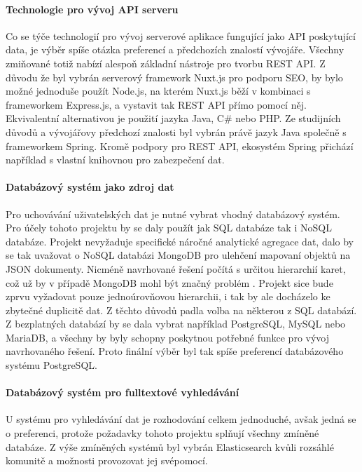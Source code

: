 			\paragraph{Technologie pro vývoj API serveru}

			Co se týče technologií pro vývoj serverové aplikace fungující jako \ac{API} poskytující data, je výběr spíše
			otázka preferencí a předchozích znalostí vývojáře.
			Všechny zmiňované totiž nabízí alespoň základní nástroje pro tvorbu \ac{REST} \ac{API}.
			Z důvodu že byl vybrán serverový framework Nuxt.js pro podporu \Ac{SEO}, by bylo možné jednoduše použít Node.js,
			na kterém Nuxt.js běží v kombinaci s frameworkem Express.js, a vystavit tak \Ac{REST} \ac{API} přímo pomocí něj.
			Ekvivalentní alternativou je použití jazyka Java, C\# nebo \Ac{PHP}.
			Ze studijních důvodů a vývojářovy předchozí znalosti byl vybrán právě jazyk Java společně s frameworkem
			Spring.
			Kromě podpory pro \ac{REST} \ac{API}, ekosystém Spring přichází například s vlastní knihovnou pro
			zabezpečení dat.

			\paragraph{Databázový systém jako zdroj dat}

			Pro uchovávání uživatelských dat je nutné vybrat vhodný databázový systém.
			Pro účely tohoto projektu by se daly použít jak \ac{SQL} databáze tak i \ac{NoSQL} databáze.
			Projekt nevyžaduje specifické náročné analytické agregace dat, dalo by se tak uvažovat o \ac{NoSQL} databázi
			MongoDB pro ulehčení mapovaní objektů na \ac{JSON} dokumenty.
			Nicméně navrhované řešení počítá s určitou hierarchií karet, což už by v případě MongoDB mohl být značný
			problém \cite{why_you_should_never_use_mongodb}.
			Projekt sice bude zprvu vyžadovat pouze jednoúrovňovou hierarchii, i tak by ale docházelo ke
			zbytečné duplicitě dat.
			Z těchto důvodů padla volba na některou z \ac{SQL} databází.
			Z bezplatných databází by se dala vybrat například PostgreSQL, MySQL nebo MariaDB, a všechny by byly schopny
			poskytnou potřebné funkce pro vývoj navrhovaného řešení.
			Proto finální výběr byl tak spíše preferencí databázového systému PostgreSQL.

			\paragraph{Databázový systém pro fulltextové vyhledávání}

			U systému pro vyhledávání dat je rozhodování celkem jednoduché, avšak jedná se o preferenci, protože
			požadavky tohoto projektu splňují všechny zmíněné databáze.
			Z výše zmíněných systémů byl vybrán Elasticsearch kvůli rozsáhlé komunitě a možnosti provozovat jej svépomocí.

